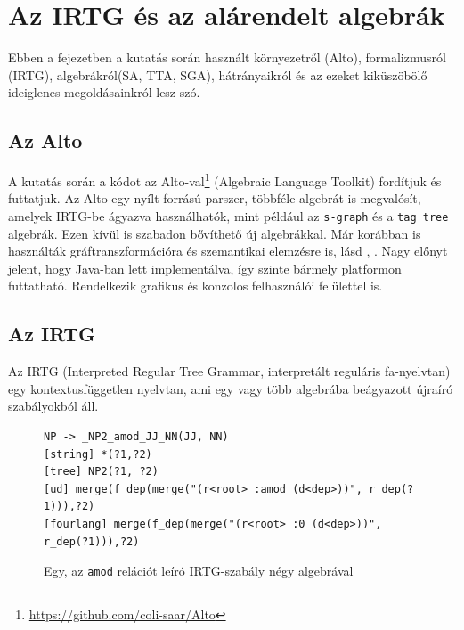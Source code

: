 \section{Az IRTG és az alárendelt algebrák}
\label{sec:aists}
Ebben a fejezetben a kutatás során használt környezetről (Alto), formalizmusról (IRTG), algebrákról(SA, TTA, SGA), hátrányaikról és az ezeket kiküszöbölő ideiglenes megoldásainkról lesz szó.

\subsection{Az Alto}
\label{sec:Alto}
A kutatás során a kódot az Alto-val\footnote{\url{https://github.com/coli-saar/Alto}} (Algebraic Language Toolkit) fordítjuk és futtatjuk. Az Alto egy nyílt forrású parszer, többféle algebrát is megvalósít, amelyek IRTG-be ágyazva használhatók, mint például az \texttt{s-graph} és a \texttt{tag tree} algebrák. Ezen kívül is szabadon bővíthető új algebrákkal. Már korábban is használták gráftranszformációra és szemantikai elemzésre is, lásd \cite{Koller:2015}, \cite{Groschwitz:2015}. Nagy előnyt jelent, hogy Java-ban lett implementálva, így szinte bármely platformon futtatható. Rendelkezik grafikus és konzolos felhasználói felülettel is.


\subsection{Az IRTG}
\label{sec:irtg}
Az IRTG (Interpreted Regular Tree Grammar, interpretált reguláris fa-nyelvtan) \cite{Koller:2011} egy kontextusfüggetlen nyelvtan, ami egy vagy több algebrába beágyazott újraíró szabályokból áll.

\begin{figure}[h]
\begin{verbatim}
NP -> _NP2_amod_JJ_NN(JJ, NN)
[string] *(?1,?2)
[tree] NP2(?1, ?2)
[ud] merge(f_dep(merge("(r<root> :amod (d<dep>))", r_dep(?1))),?2)
[fourlang] merge(f_dep(merge("(r<root> :0 (d<dep>))", r_dep(?1))),?2)
\end{verbatim}
\caption{Egy, az \texttt{amod} relációt leíró IRTG-szabály négy algebrával}
\label{fig:amod_irtg}
\end{figure}

